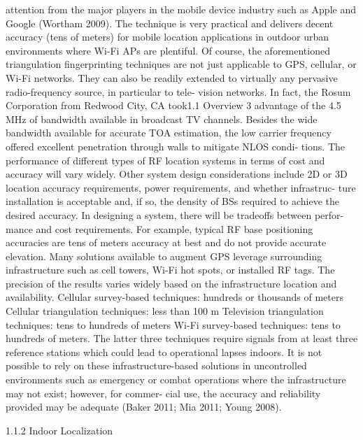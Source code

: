 attention from the major players in the mobile device industry such as Apple and
Google (Wortham 2009). The technique is very practical and delivers decent
accuracy (tens of meters) for mobile location applications in outdoor urban
environments where Wi-Fi APs are plentiful.
Of course, the aforementioned triangulation fingerprinting techniques are not
just applicable to GPS, cellular, or Wi-Fi networks. They can also be readily
extended to virtually any pervasive radio-frequency source, in particular to tele-
vision networks. In fact, the Rosum Corporation from Redwood City, CA took1.1 Overview
3
advantage of the 4.5 MHz of bandwidth available in broadcast TV channels.
Besides the wide bandwidth available for accurate TOA estimation, the low carrier
frequency offered excellent penetration through walls to mitigate NLOS condi-
tions. The performance of different types of RF location systems in terms of cost
and accuracy will vary widely. Other system design considerations include 2D or
3D location accuracy requirements, power requirements, and whether infrastruc-
ture installation is acceptable and, if so, the density of BSs required to achieve the
desired accuracy. In designing a system, there will be tradeoffs between perfor-
mance and cost requirements. For example, typical RF base positioning accuracies
are tens of meters accuracy at best and do not provide accurate elevation. Many
solutions available to augment GPS leverage surrounding infrastructure such as
cell towers, Wi-Fi hot spots, or installed RF tags. The precision of the results
varies widely based on the infrastructure location and availability.
Cellular survey-based techniques: hundreds or thousands of meters
Cellular triangulation techniques: less than 100 m
Television triangulation techniques: tens to hundreds of meters
Wi-Fi survey-based techniques: tens to hundreds of meters.
The latter three techniques require signals from at least three reference stations
which could lead to operational lapses indoors. It is not possible to rely on these
infrastructure-based solutions in uncontrolled environments such as emergency or
combat operations where the infrastructure may not exist; however, for commer-
cial use, the accuracy and reliability provided may be adequate (Baker 2011; Mia
2011; Young 2008).


1.1.2 Indoor Localization


